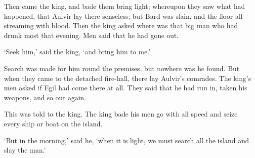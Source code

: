 Then came the king, and bade them bring light; whereupon they saw what had happened, that Aulvir lay there senseless; but Bard was slain, and the floor all streaming with blood. Then the king asked where was that big man who had drunk most that evening. Men said that he had gone out.

`Seek him,' said the king, `and bring him to me.'

Search was made for him round the premises, but nowhere was he found. But when they came to the detached fire-hall, there lay Aulvir's comrades. The king's men asked if Egil had come there at all. They said that he had run in, taken his weapons, and so out again.

This was told to the king. The king bade his men go with all speed and seize every ship or boat on the island.

`But in the morning,' said he, `when it is light, we must search all the island and slay the man.'
